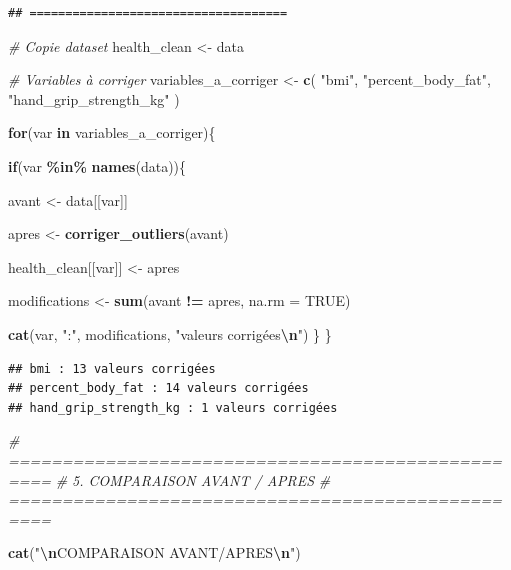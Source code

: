 \documentclass[
]{article}
\newenvironment{Shaded}{\begin{snugshade}}{\end{snugshade}}
\newcommand{\AttributeTok}[1]{\textcolor[rgb]{0.13,0.29,0.53}{#1}}
\newcommand{\CommentTok}[1]{\textcolor[rgb]{0.56,0.35,0.01}{\textit{#1}}}
\newcommand{\ConstantTok}[1]{\textcolor[rgb]{0.56,0.35,0.01}{#1}}
\newcommand{\ControlFlowTok}[1]{\textcolor[rgb]{0.13,0.29,0.53}{\textbf{#1}}}
\newcommand{\FunctionTok}[1]{\textcolor[rgb]{0.13,0.29,0.53}{\textbf{#1}}}
\newcommand{\NormalTok}[1]{#1}
\newcommand{\OtherTok}[1]{\textcolor[rgb]{0.56,0.35,0.01}{#1}}
\newcommand{\SpecialCharTok}[1]{\textcolor[rgb]{0.81,0.36,0.00}{\textbf{#1}}}
\newcommand{\StringTok}[1]{\textcolor[rgb]{0.31,0.60,0.02}{#1}}
\begin{document}
\begin{verbatim}
## ====================================
\end{verbatim}

\begin{Shaded}
\begin{Highlighting}[]
\CommentTok{\# Copie dataset}
\NormalTok{health\_clean }\OtherTok{\textless{}{-}}\NormalTok{ data}

\CommentTok{\# Variables à corriger}
\NormalTok{variables\_a\_corriger }\OtherTok{\textless{}{-}} \FunctionTok{c}\NormalTok{(}
\StringTok{"bmi"}\NormalTok{,}
\StringTok{"percent\_body\_fat"}\NormalTok{,}
\StringTok{"hand\_grip\_strength\_kg"}
\NormalTok{)}

\ControlFlowTok{for}\NormalTok{(var }\ControlFlowTok{in}\NormalTok{ variables\_a\_corriger)\{}

\ControlFlowTok{if}\NormalTok{(var }\SpecialCharTok{\%in\%} \FunctionTok{names}\NormalTok{(data))\{}

\NormalTok{avant }\OtherTok{\textless{}{-}}\NormalTok{ data[[var]]}

\NormalTok{apres }\OtherTok{\textless{}{-}} \FunctionTok{corriger\_outliers}\NormalTok{(avant)}

\NormalTok{health\_clean[[var]] }\OtherTok{\textless{}{-}}\NormalTok{ apres}

\NormalTok{modifications }\OtherTok{\textless{}{-}} \FunctionTok{sum}\NormalTok{(avant }\SpecialCharTok{!=}\NormalTok{ apres, }\AttributeTok{na.rm =} \ConstantTok{TRUE}\NormalTok{)}

\FunctionTok{cat}\NormalTok{(var, }\StringTok{":"}\NormalTok{, modifications, }\StringTok{"valeurs corrigées}\SpecialCharTok{\textbackslash{}n}\StringTok{"}\NormalTok{)}
\NormalTok{\}}
\NormalTok{\}}
\end{Highlighting}
\end{Shaded}

\begin{verbatim}
## bmi : 13 valeurs corrigées
## percent_body_fat : 14 valeurs corrigées
## hand_grip_strength_kg : 1 valeurs corrigées
\end{verbatim}

\begin{Shaded}
\begin{Highlighting}[]
\CommentTok{\# ==================================================}
\CommentTok{\# 5. COMPARAISON AVANT / APRES}
\CommentTok{\# ==================================================}

\FunctionTok{cat}\NormalTok{(}\StringTok{"}\SpecialCharTok{\textbackslash{}n}\StringTok{COMPARAISON AVANT/APRES}\SpecialCharTok{\textbackslash{}n}\StringTok{"}\NormalTok{)}
\end{Highlighting}
\end{Shaded}
\end{document}

